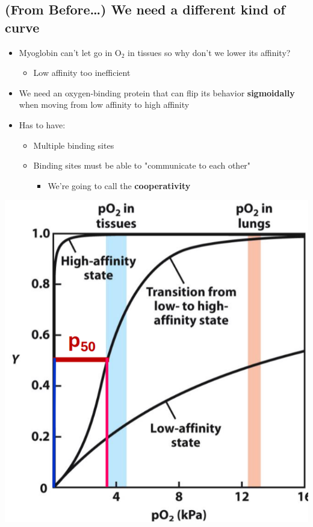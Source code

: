 \documentclass[10pt]{article}
\begin{document}
\subsection*{(From Before\dots) We need a different kind of curve}
\begin{itemize}
    \item Myoglobin can't let go in O$_2$ in tissues so why don't we lower its affinity?
    \begin{itemize}
        \item Low affinity too inefficient
    \end{itemize}
    \item We need an oxygen-binding protein that can flip its behavior \textbf{sigmoidally} when moving from low affinity to high affinity
    \item Has to have:
    \begin{itemize}
        \item Multiple binding sites
        \item Binding sites must be able to "communicate to each other"
        \begin{itemize}
            \item We're going to call the \textbf{cooperativity}
        \end{itemize}
    \end{itemize}
\end{itemize}
\begin{center}
    \includegraphics*[scale=0.6]{L3_12.png}
\end{center}
\end{document}
